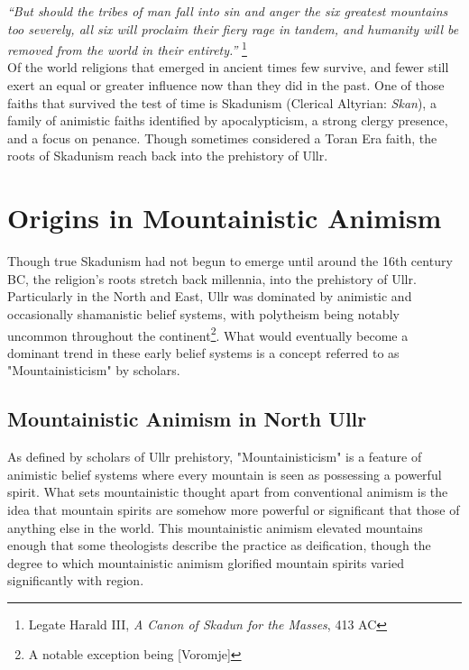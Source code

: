 \textit{``But should the tribes of man fall into sin and anger the six greatest mountains too severely, all six will proclaim their fiery rage in tandem, and humanity will be removed from the world in their entirety.''} \footnote{Legate Harald III, \textit{A Canon of Skadun for the Masses}, 413 AC}\\


Of the world religions that emerged in ancient times few survive, and fewer still exert an equal or greater influence now than they did in the past. One of those faiths that survived the test of time is Skadunism (Clerical Altyrian: \textit{Skan}), a family of animistic faiths identified by apocalypticism, a strong clergy presence, and a focus on penance. Though sometimes considered a Toran Era faith, the roots of Skadunism reach back into the prehistory of Ullr.

\section{Origins in Mountainistic Animism}

Though true Skadunism had not begun to emerge until around the 16th century BC, the religion's roots stretch back millennia, into the prehistory of Ullr. Particularly in the North and East, Ullr was dominated by animistic and occasionally shamanistic belief systems, with polytheism being notably uncommon throughout the continent\footnote{A notable exception being [Voromje]}. What would eventually become a dominant trend in these early belief systems is a concept referred to as "Mountainisticism" by scholars.

\subsection{Mountainistic Animism in North Ullr}

As defined by scholars of Ullr prehistory, "Mountainisticism" is a feature of animistic belief systems where every mountain is seen as possessing a powerful spirit. What sets mountainistic thought apart from conventional animism is the idea that mountain spirits are somehow more powerful or significant that those of anything else in the world. This mountainistic animism elevated mountains enough that some theologists describe the practice as deification, though the degree to which mountainistic animism glorified mountain spirits varied significantly with region.\par

